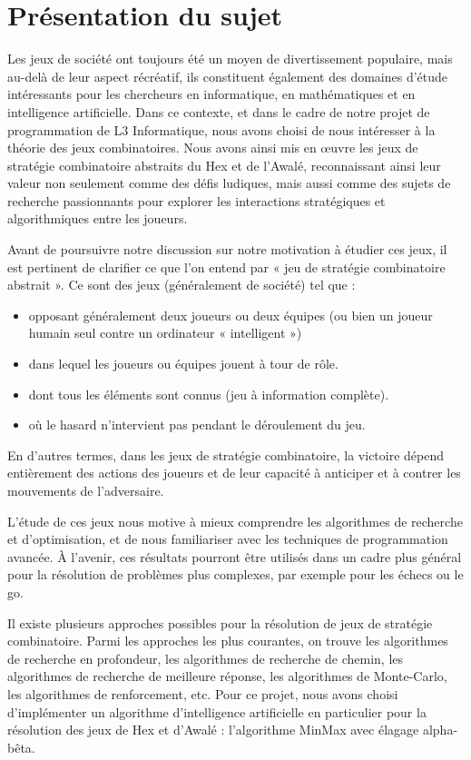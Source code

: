 \section{Présentation du sujet}
Les jeux de société ont toujours été un moyen de divertissement populaire, mais au-delà 
de leur aspect récréatif, ils constituent également des domaines d'étude intéressants pour les 
chercheurs en informatique, en mathématiques et en intelligence artificielle. 
Dans ce contexte, et dans le cadre de notre projet de programmation de L3 Informatique, 
nous avons choisi de nous intéresser à la théorie des jeux combinatoires. Nous avons ainsi mis 
en œuvre les jeux de stratégie combinatoire abstraits du Hex et de l'Awalé, reconnaissant ainsi 
leur valeur non seulement comme des défis ludiques, mais aussi comme des sujets de recherche 
passionnants pour explorer les interactions stratégiques et algorithmiques entre les joueurs.

Avant de poursuivre notre discussion sur notre motivation à étudier ces jeux, il est pertinent
de clarifier ce que l'on entend par « jeu de stratégie combinatoire abstrait ». Ce sont des jeux 
(généralement de société) tel que :
\begin{itemize}
	\item opposant généralement deux joueurs ou deux équipes (ou bien un joueur humain seul 
	contre un ordinateur « intelligent »)
	\item dans lequel les joueurs ou équipes jouent à tour de rôle.
	\item dont tous les éléments sont connus (jeu à information complète).
	\item où le hasard n'intervient pas pendant le déroulement du jeu.
\end{itemize}
En d'autres termes, dans les jeux de stratégie combinatoire, la victoire dépend entièrement 
des actions des joueurs et de leur capacité à anticiper et à contrer les mouvements de l'adversaire. 


L'étude de ces jeux nous motive à mieux comprendre les algorithmes de 
recherche et d'optimisation, et de nous familiariser avec les techniques de 
programmation avancée. À l'avenir, ces résultats pourront être utilisés dans
un cadre plus général pour la résolution de problèmes plus complexes, par exemple
pour les échecs ou le go. 


Il existe plusieurs approches possibles pour la résolution de jeux de stratégie
combinatoire. Parmi les approches les plus courantes, on trouve les algorithmes
de recherche en profondeur, les algorithmes de recherche de chemin, les
algorithmes de recherche de meilleure réponse, les algorithmes de Monte-Carlo,
les algorithmes de renforcement, etc.
Pour ce projet, nous avons choisi d'implémenter un algorithme d'intelligence artificielle 
en particulier pour la résolution des jeux de Hex et d'Awalé : l'algorithme MinMax avec élagage
alpha-bêta.

